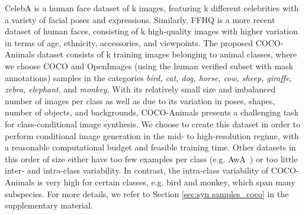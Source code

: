 \documentclass[10pt,twocolumn,letterpaper]{article}
\begin{document}
CelebA is a human face dataset of \unit{k} images, featuring \unit{k} different celebrities with a variety of facial poses and expressions. Similarly, FFHQ is a more recent dataset of human faces, consisting of \unit{k} high-quality images with higher variation in terms of age, ethnicity, accessories, and viewpoints. 
The proposed COCO-Animals dataset consists of \unit{k} training images belonging to  animal classes, where 
we choose COCO and OpenImages (using the human verified subset with mask annotations) samples in the categories \textit{bird, cat, dog, horse, cow, sheep, giraffe, zebra, elephant}, and \textit{monkey}.  With its relatively small size and imbalanced number of images per class as well as due to its variation in poses, shapes, number of objects, and backgrounds, COCO-Animals presents a challenging task for class-conditional image synthesis.
We choose to create this dataset in order to perform conditional image generation in the mid- to high-resolution regime, with a reasonable computational budget and feasible training time. Other datasets in this order of size either have too few examples per class (e.g. AwA~\cite{Xian2017ZeroShotLC}) or too little inter- and intra-class variability. In contrast, the intra-class variability of COCO-Animals is very high for certain classes, e.g. bird and monkey, which span many subspecies. For more details, we refer to Section \ref{sec:syn samples_coco} in the supplementary material.
\end{document}
